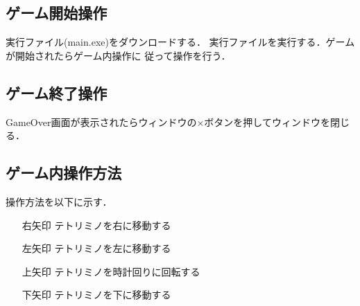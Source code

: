 \subsection{ゲーム開始操作}
実行ファイル(main.exe)をダウンロードする．
実行ファイルを実行する．ゲームが開始されたらゲーム内操作に
従って操作を行う．
\subsection{ゲーム終了操作}
GameOver画面が表示されたらウィンドウの×ボタンを押してウィンドウを閉じる．
\subsection{ゲーム内操作方法}
操作方法を以下に示す．
\begin{itemize}
  \item[右矢印] テトリミノを右に移動する
  \item[左矢印] テトリミノを左に移動する
  \item[上矢印] テトリミノを時計回りに回転する
  \item[下矢印] テトリミノを下に移動する
\end{itemize}
